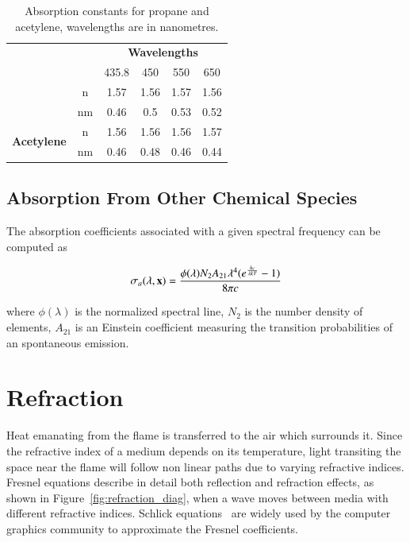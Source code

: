 \begin{table}[htbp!]
\centering
\caption{Absorption constants for propane and acetylene, wavelengths are in nanometres.}
\label{tb:soot_absorption_coefficients}
\begin{tabular}{cc|c|c|c|c|}
\cline{3-6}
                                                 &    & \multicolumn{4}{c|}{\textbf{Wavelengths}} \\ \cline{3-6} 
                                                 &    & 435.8   & 450    & 550   & 650   \\ \hhline{--|=|=|=|=|}
\multicolumn{1}{|c|}{\multirow{2}{*}{\textbf{Propane}}}   & \multicolumn{1}{c||}{n}  & 1.57    & 1.56   & 1.57  & 1.56  \\ \cline{2-6} 
\multicolumn{1}{|c|}{}                           & \multicolumn{1}{c||}{nm} & 0.46    & 0.5    & 0.53  & 0.52  \\ \hline
\multicolumn{1}{|c|}{\multirow{2}{*}{\textbf{Acetylene}}} & \multicolumn{1}{c||}{n}  & 1.56    & 1.56   & 1.56  & 1.57  \\ \cline{2-6} 
\multicolumn{1}{|c|}{}                           & \multicolumn{1}{c||}{nm} & 0.46    & 0.48   & 0.46  & 0.44  \\ \hline
\end{tabular}
\end{table}

\subsection{Absorption From Other Chemical Species}
\label{sec:absorption_from_chemical_species}

The absorption coefficients associated with a given spectral frequency can be computed as


\begin{equation}
\sigma_a(\lambda, \mathbf{x}) = \frac{\phi(\lambda) N_2 A_{21} \lambda^4 (e ^\frac{h c}{\lambda k T} - 1)}{8 \pi c}
\end{equation}

where $\phi(\lambda)$ is the normalized spectral line, $N_2$ is the number density of elements, $A_{21}$ is an Einstein coefficient measuring the transition probabilities of an spontaneous emission.

\section{Refraction}
\label{sec:refraction}

Heat emanating from the flame is transferred to the air which surrounds it.
Since the refractive index of a medium depends on its temperature, light transiting the space near the flame will follow non linear paths due to varying refractive indices.
Fresnel equations describe in detail both reflection and refraction effects, as shown in Figure~\ref{fig:refraction_diag}, when a wave moves between media with different refractive indices.
Schlick equations~\cite{Schlick1994} are widely used by the computer graphics community to approximate the Fresnel coefficients.

